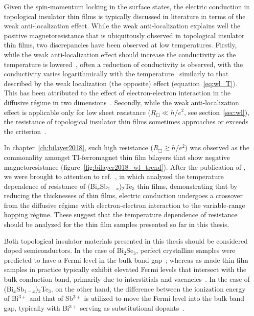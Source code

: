Given the spin-momentum locking in the surface states, the electric conduction in topological insulator thin films is typically discussed in literature in terms of the weak anti-localization effect. While the weak anti-localization explains well the positive magnetoresistance that is ubiquitously observed in topological insulator thin films, two discrepancies have been observed at low temperatures. Firstly, while the weak anti-localization effect should increase the conductivity as the temperature is lowered~\cite{bergmann1984}, often a reduction of conductivity is observed, with the conductivity varies logarithmically with the temperature~\cite{Chen2011, Liu2011, Roy2013} similarly to that described by the weak localization (the opposite) effect (equation~\ref{eq:wl_T}). This has been attributed to the effect of electron-electron interaction in the diffusive r\'egime in two dimensions~\cite{WL_ee}. Secondly, while the weak anti-localization effect is applicable only for low sheet resistance ($R_\Box \ll h/e^2$, see section~\ref{sec:wl}), the resistance of topological insulator thin films sometimes approaches or exceeds the criterion~\cite{TI_WAL_thickness, ZhangJS2011}.

In chapter~\ref{ch:bilayer2018}, such high resistance ($R_\Box \gtrsim h/e^2$) was observed as the commonality amongst TI-ferromagnet thin film bilayers that show negative magnetoresistance (figure~\ref{fig:bilayer2018_wl_trend}). After the publication of \cite{bilayer2018}, we were brought to attention to ref.~\cite{liao2015}, in which \citeauthor{liao2015} analyzed the temperature dependence of resistance of (Bi$_x$Sb$_{1-x}$)$_2$Te$_3$ thin films, demonstrating that by reducing the thicknesses of thin films, electric conduction undergoes a crossover from the diffusive r\'egime with electron-electron interaction to the variable-range hopping r\'egime. These suggest that the temperature dependence of resistance should be analyzed for the thin film samples presented so far in this thesis.

Both topological insulator materials presented in this thesis should be considered doped semiconductors. In the case of Bi$_2$Se$_3$, perfect crystalline samples were predicted to have a Fermi level in the bulk band gap~\cite{TI_electronic_structure_zhang}; whereas as-made thin film samples in practice typically exhibit elevated Fermi levels that intersect with the bulk conduction band, primarily due to interstitials and vacancies~\cite{TI_ARPES1, ARPES_thickness, zhangli2013, Zhanybek3, Fisher2010}. In the case of (Bi$_x$Sb$_{1-x}$)$_2$Te$_3$, on the other hand, the difference between the ionization energy of Bi$^{3+}$ and that of Sb$^{3+}$ is utilized to move the Fermi level into the bulk band gap, typically with Bi$^{3+}$ serving as substitutional dopants~\cite{ZhangJS2011, TI_electronic_structure_zhang}.

